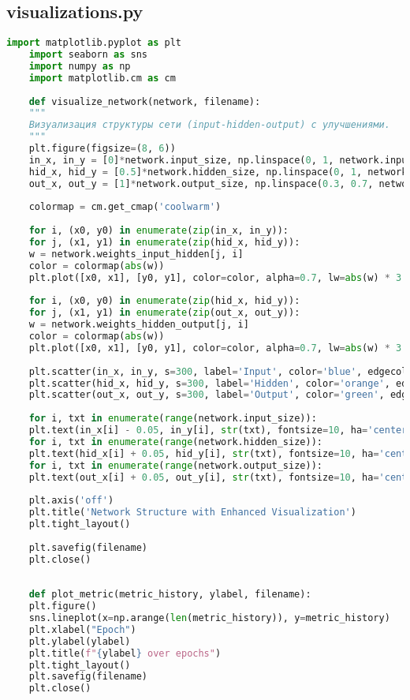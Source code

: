 \documentclass[a4paper,12pt]{article}
\begin{document}
\subsection*{visualizations.py}
\begin{lstlisting}[language=Python, caption={visualizations.py}]
	import matplotlib.pyplot as plt
	import seaborn as sns
	import numpy as np
	import matplotlib.cm as cm
	
	def visualize_network(network, filename):
	"""
	Визуализация структуры сети (input-hidden-output) с улучшениями.
	"""
	plt.figure(figsize=(8, 6))
	in_x, in_y = [0]*network.input_size, np.linspace(0, 1, network.input_size)
	hid_x, hid_y = [0.5]*network.hidden_size, np.linspace(0, 1, network.hidden_size)
	out_x, out_y = [1]*network.output_size, np.linspace(0.3, 0.7, network.output_size)
	
	colormap = cm.get_cmap('coolwarm')
	
	for i, (x0, y0) in enumerate(zip(in_x, in_y)):
	for j, (x1, y1) in enumerate(zip(hid_x, hid_y)):
	w = network.weights_input_hidden[j, i]
	color = colormap(abs(w))
	plt.plot([x0, x1], [y0, y1], color=color, alpha=0.7, lw=abs(w) * 3 + 1)
	
	for i, (x0, y0) in enumerate(zip(hid_x, hid_y)):
	for j, (x1, y1) in enumerate(zip(out_x, out_y)):
	w = network.weights_hidden_output[j, i]
	color = colormap(abs(w))
	plt.plot([x0, x1], [y0, y1], color=color, alpha=0.7, lw=abs(w) * 3 + 1)
	
	plt.scatter(in_x, in_y, s=300, label='Input', color='blue', edgecolors='black', linewidths=1)
	plt.scatter(hid_x, hid_y, s=300, label='Hidden', color='orange', edgecolors='black', linewidths=1)
	plt.scatter(out_x, out_y, s=300, label='Output', color='green', edgecolors='black', linewidths=1)
	
	for i, txt in enumerate(range(network.input_size)):
	plt.text(in_x[i] - 0.05, in_y[i], str(txt), fontsize=10, ha='center', color='white')
	for i, txt in enumerate(range(network.hidden_size)):
	plt.text(hid_x[i] + 0.05, hid_y[i], str(txt), fontsize=10, ha='center', color='black')
	for i, txt in enumerate(range(network.output_size)):
	plt.text(out_x[i] + 0.05, out_y[i], str(txt), fontsize=10, ha='center', color='black')
	
	plt.axis('off')
	plt.title('Network Structure with Enhanced Visualization')
	plt.tight_layout()
	
	plt.savefig(filename)
	plt.close()
	
	
	def plot_metric(metric_history, ylabel, filename):
	plt.figure()
	sns.lineplot(x=np.arange(len(metric_history)), y=metric_history)
	plt.xlabel("Epoch")
	plt.ylabel(ylabel)
	plt.title(f"{ylabel} over epochs")
	plt.tight_layout()
	plt.savefig(filename)
	plt.close()
\end{lstlisting}
\newpage
\end{document}
